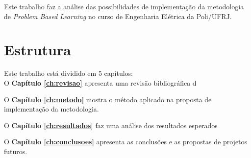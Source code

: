 		Este trabalho faz a análise das possibilidades de implementação da metodologia de \textit{Problem Based Learning} no curso de Engenharia Elétrica da Poli/UFRJ.
		
	\section{Estrutura}
	
		Este trabalho está dividido em 5 capítulos:\\
		
		O \textbf{Capítulo \ref{ch:revisao}} apresenta uma revisão bibliográfica d
		
		O \textbf{Capítulo \ref{ch:metodo}} mostra o método aplicado na proposta de implementação da metodologia.
		
		O \textbf{Capítulo \ref{ch:resultados}} faz uma análise dos resultados esperados 
		
		O \textbf{Capítulo \ref{ch:conclusoes}} apresenta as conclusões e as propostas de projetos futuros.